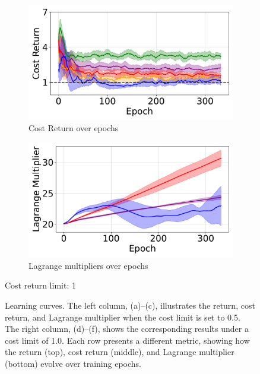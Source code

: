 \begin{figure}[H]
\begin{minipage}{0.48\textwidth}
        \begin{subfigure}{\linewidth}
            \centering
            \includegraphics[width=\linewidth]{figure/PointGoal/limit 1/EpCost.pdf}
            \caption{Cost Return over epochs}
        \end{subfigure}

        \begin{subfigure}{\linewidth}
            \centering
            \includegraphics[width=\linewidth]{figure/PointGoal/limit 1/lagrange.pdf}
            \caption{Lagrange multipliers over epochs}
        \end{subfigure}

        \caption*{Cost return limit: 1}
    \end{minipage}

    \caption{Learning curves.
    The left column, (a)–(c), illustrates the return, cost return, and Lagrange multiplier when the cost limit is set to 0.5. 
    The right column, (d)–(f), shows the corresponding results under a cost limit of 1.0. 
    Each row presents a different metric, showing how the return (top), cost return (middle), and Lagrange multiplier (bottom) evolve over training epochs.}
    \label{fig:point_goal_results_vertical1}
\end{figure}

